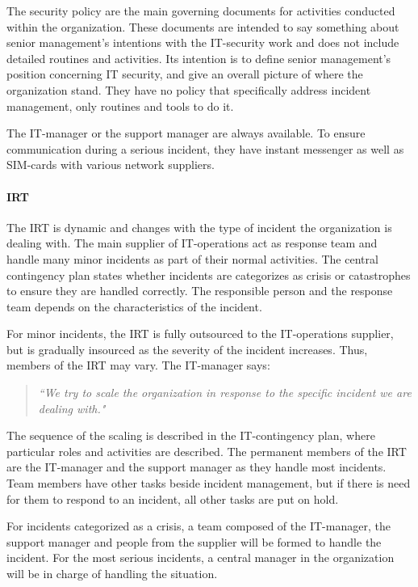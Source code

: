 The security policy are the main governing documents for activities conducted within the organization. These documents are intended to say something about senior management's intentions with the IT-security work and does not include detailed routines and activities. Its intention is to define senior management's position concerning IT security, and give an overall picture of where the organization stand. They have no policy that specifically address incident management, only routines and tools to do it.

The IT-manager or the support manager are always available. To ensure communication during a serious incident, they have instant messenger as well as SIM-cards with various network suppliers. 

\paragraph{\acl{IRT}}
The \ac{IRT} is dynamic and changes with the type of incident the organization is dealing with. The main supplier of IT-operations act as response team and handle many minor incidents as part of their normal activities. The central contingency plan states whether incidents are categorizes as crisis or catastrophes to ensure they are handled correctly. The responsible person and the response team depends on the characteristics of the incident.   

For minor incidents, the \ac{IRT} is fully outsourced to the IT-operations supplier, but is gradually insourced as the severity of the incident increases. Thus, members of the \ac{IRT} may vary. The IT-manager says:
\begin{quote}
\textit{``We try to scale the organization in response to the specific incident we are dealing with."}
\end{quote}

The sequence of the scaling is described in the IT-contingency plan, where particular roles and activities are described. The permanent members of the \ac{IRT} are the IT-manager and the support manager as they handle most incidents. Team members have other tasks beside incident management, but if there is need for them to respond to an incident, all other tasks are put on hold.

For incidents categorized as a crisis, a team composed of the IT-manager, the support manager and people from the supplier will be formed to handle the incident. For the most serious incidents, a central manager in the organization will be in charge of handling the situation.


